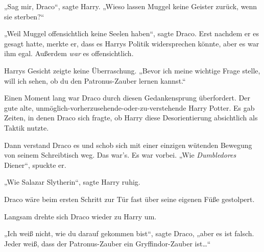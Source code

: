 „Sag mir, Draco“, sagte Harry. „Wieso lassen Muggel keine Geister zurück, wenn sie sterben?“

„Weil Muggel offensichtlich keine Seelen haben“, sagte Draco. Erst nachdem er es gesagt hatte, merkte er, dass es Harrys Politik widersprechen könnte, aber es war ihm egal. Außerdem \emph{war} es offensichtlich.

Harrys Gesicht zeigte keine Überraschung. „Bevor ich meine wichtige Frage stelle, will ich sehen, ob du den Patronus-Zauber lernen kannst.“

Einen Moment lang war Draco durch diesen Gedankensprung überfordert. Der gute alte, unmöglich-vorherzusehende-oder-zu-verstehende Harry Potter. Es gab Zeiten, in denen Draco sich fragte, ob Harry diese Desorientierung absichtlich als Taktik nutzte.

Dann verstand Draco es und schob sich mit einer einzigen wütenden Bewegung von seinem Schreibtisch weg. Das war’s. Es war vorbei. „Wie \emph{Dumbledores} Diener“, spuckte er.

„Wie Salazar Slytherin“, sagte Harry ruhig.

Draco wäre beim ersten Schritt zur Tür fast über seine eigenen Füße gestolpert.

Langsam drehte sich Draco wieder zu Harry um.

„Ich weiß nicht, wie du darauf gekommen bist“, sagte Draco, „aber es ist falsch. Jeder weiß, dass der Patronus-Zauber ein Gryffindor-Zauber ist…“

